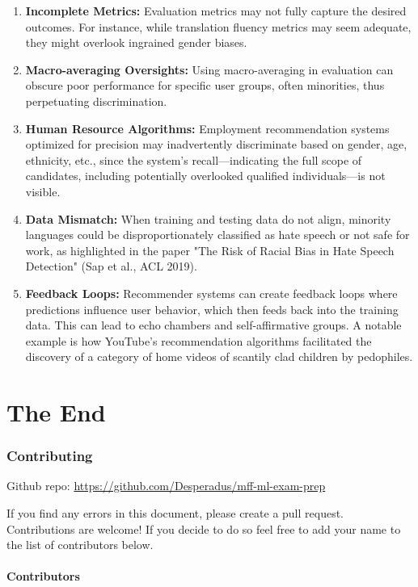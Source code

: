 \documentclass[11pt]{article}
\begin{document}
\begin{enumerate}
    \item \textbf{Incomplete Metrics:} Evaluation metrics may not fully capture the desired outcomes. For instance, while translation fluency metrics may seem adequate, they might overlook ingrained gender biases.
    \item \textbf{Macro-averaging Oversights:} Using macro-averaging in evaluation can obscure poor performance for specific user groups, often minorities, thus perpetuating discrimination.
    \item \textbf{Human Resource Algorithms:} Employment recommendation systems optimized for precision may inadvertently discriminate based on gender, age, ethnicity, etc., since the system's recall—indicating the full scope of candidates, including potentially overlooked qualified individuals—is not visible.
    \item \textbf{Data Mismatch:} When training and testing data do not align, minority languages could be disproportionately classified as hate speech or not safe for work, as highlighted in the paper "The Risk of Racial Bias in Hate Speech Detection" (Sap et al., ACL 2019).
    \item \textbf{Feedback Loops:} Recommender systems can create feedback loops where predictions influence user behavior, which then feeds back into the training data. This can lead to echo chambers and self-affirmative groups. A notable example is how YouTube's recommendation algorithms facilitated the discovery of a category of home videos of scantily clad children by pedophiles.
  \end{enumerate}
  
\part{The End}

\section{Contributing}
Github repo: \url{https://github.com/Desperadus/mff-ml-exam-prep}

If you find any errors in this document, please create a pull request. Contributions are welcome!
If you decide to do so feel free to add your name to the list of contributors below.



\subsection{Contributors}
\end{document}
